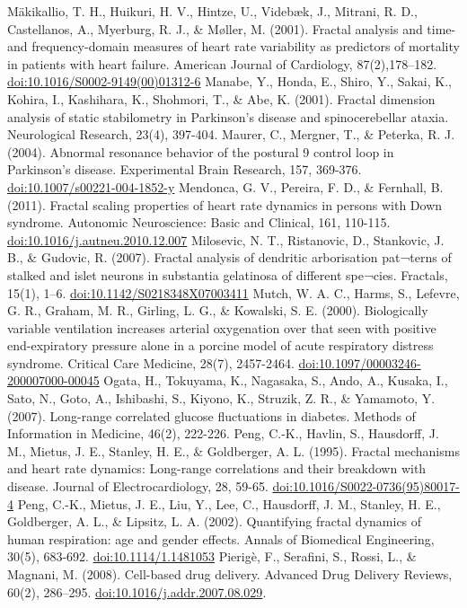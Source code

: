 \documentclass[12pt,]{book}
\begin{document}
Mäkikallio, T. H., Huikuri, H. V., Hintze, U., Videbæk, J., Mitrani, R. D., Castellanos, A., Myerburg, R. J., \& Møller, M. (2001). Fractal analysis and time- and frequency-domain measures of heart rate variability as predictors of mortality in patients with heart failure. American Journal of Cardiology, 87(2),178--182. \url{doi:10.1016/S0002-9149(00)01312-6}
Manabe, Y., Honda, E., Shiro, Y., Sakai, K., Kohira, I., Kashihara, K., Shohmori, T., \& Abe, K. (2001). Fractal dimension analysis of static stabilometry in Parkinson's disease and spinocerebellar ataxia. Neurological Research, 23(4), 397-404.
Maurer, C., Mergner, T., \& Peterka, R. J. (2004). Abnormal resonance behavior of the postural 9 control loop in Parkinson's disease. Experimental Brain Research, 157, 369-376. \url{doi:10.1007/s00221-004-1852-y}
Mendonca, G. V., Pereira, F. D., \& Fernhall, B. (2011). Fractal scaling properties of heart rate dynamics in persons with Down syndrome. Autonomic Neuroscience: Basic and Clinical, 161, 110-115. \url{doi:10.1016/j.autneu.2010.12.007}
Milosevic, N. T., Ristanovic, D., Stankovic, J. B., \& Gudovic, R. (2007). Fractal analysis of dendritic arborisation pat¬terns of stalked and islet neurons in substantia gelatinosa of different spe¬cies. Fractals, 15(1), 1--6. \url{doi:10.1142/S0218348X07003411}
Mutch, W. A. C., Harms, S., Lefevre, G. R., Graham, M. R., Girling, L. G., \& Kowalski, S. E. (2000). Biologically variable ventilation increases arterial oxygenation over that seen with positive end-expiratory pressure alone in a porcine model of acute respiratory distress syndrome. Critical Care Medicine, 28(7), 2457-2464. \url{doi:10.1097/00003246-200007000-00045}
Ogata, H., Tokuyama, K., Nagasaka, S., Ando, A., Kusaka, I., Sato, N., Goto, A., Ishibashi, S., Kiyono, K., Struzik, Z. R., \& Yamamoto, Y. (2007). Long-range correlated glucose fluctuations in diabetes. Methods of Information in Medicine, 46(2), 222-226.
Peng, C.-K., Havlin, S., Hausdorff, J. M., Mietus, J. E., Stanley, H. E., \& Goldberger, A. L. (1995). Fractal mechanisms and heart rate dynamics: Long-range correlations and their breakdown with disease. Journal of Electrocardiology, 28, 59-65. \url{doi:10.1016/S0022-0736(95)80017-4}
Peng, C.-K., Mietus, J. E., Liu, Y., Lee, C., Hausdorff, J. M., Stanley, H. E., Goldberger, A. L., \& Lipsitz, L. A. (2002). Quantifying fractal dynamics of human respiration: age and gender effects. Annals of Biomedical Engineering, 30(5), 683-692. \url{doi:10.1114/1.1481053}
Pierigè, F., Serafini, S., Rossi, L., \& Magnani, M. (2008). Cell-based drug delivery. Advanced Drug Delivery Reviews, 60(2), 286--295. \url{doi:10.1016/j.addr.2007.08.029}.
\end{document}
